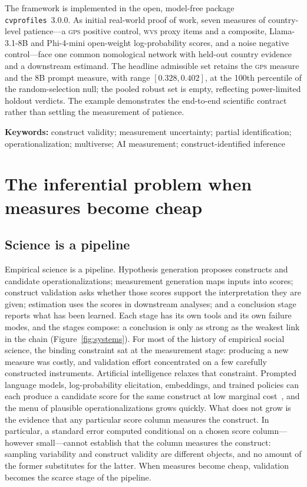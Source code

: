 \documentclass[10pt,letterpaper]{article}
\newcommand{\GPS}{\textsc{gps}}
\newcommand{\WVS}{\textsc{wvs}}
\newcommand{\cvp}{\texttt{cvprofiles}}
\begin{document}
The framework is implemented in the open, model-free package \cvp{}~3.0.0.
As initial real-world proof of work, seven measures of country-level patience---a \GPS{} positive control, \WVS{} proxy items and a composite, Llama-3.1-8B and Phi-4-mini open-weight log-probability scores, and a noise negative control---face one common nomological network with held-out country evidence and a downstream estimand.
The headline admissible set retains the \GPS{} measure and the 8B prompt measure, with range $[0.328,0.402]$, at the 100th percentile of the random-selection null; the pooled robust set is empty, reflecting power-limited holdout verdicts.
The example demonstrates the end-to-end scientific contract rather than settling the measurement of patience.

\noindent\textbf{Keywords:}
construct validity; measurement uncertainty; partial identification; operationalization; multiverse; AI measurement; construct-identified inference

\section{The inferential problem when measures become cheap}
\label{sec:problem}

\subsection{Science is a pipeline}
Empirical science is a pipeline.
Hypothesis generation proposes constructs and candidate operationalizations; measurement generation maps inputs into scores; construct validation asks whether those scores support the interpretation they are given; estimation uses the scores in downstream analyses; and a conclusion stage reports what has been learned.
Each stage has its own tools and its own failure modes, and the stages compose: a conclusion is only as strong as the weakest link in the chain (Figure~\ref{fig:systems}).
For most of the history of empirical social science, the binding constraint sat at the measurement stage: producing a new measure was costly, and validation effort concentrated on a few carefully constructed instruments.
Artificial intelligence relaxes that constraint.
Prompted language models, log-probability elicitation, embeddings, and trained policies can each produce a candidate score for the same construct at low marginal cost~\cite{horton2023,manning2024}, and the menu of plausible operationalizations grows quickly.
What does not grow is the evidence that any particular score column measures the construct.
In particular, a standard error computed conditional on a chosen score column---however small---cannot establish that the column measures the construct: sampling variability and construct validity are different objects, and no amount of the former substitutes for the latter.
When measures become cheap, validation becomes the scarce stage of the pipeline.
\end{document}
